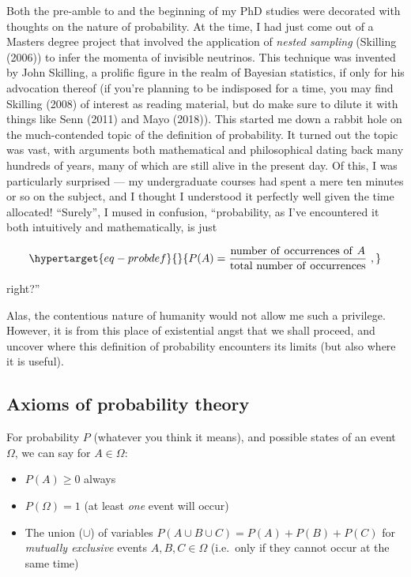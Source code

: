 \documentclass[
  11pt,
  numbers=noendperiod]{book}
\providecommand{\tightlist}{%
  \setlength{\itemsep}{0pt}\setlength{\parskip}{0pt}}\usepackage{longtable,booktabs,array}
\begin{document}
Both the pre-amble to and the beginning of my PhD studies were decorated
with thoughts on the nature of probability. At the time, I had just come
out of a Masters degree project that involved the application of
\emph{nested sampling} (Skilling (2006)) to infer the momenta of invisible
neutrinos. This technique was invented by John Skilling, a prolific
figure in the realm of Bayesian statistics, if only for his advocation
thereof (if you're planning to be indisposed for a time, you may find
Skilling (2008) of interest as reading material, but do make sure to
dilute it with things like Senn (2011) and Mayo (2018)). This started me
down a rabbit hole on the much-contended topic of the definition of
probability. It turned out the topic was vast, with arguments both
mathematical and philosophical dating back many hundreds of years, many
of which are still alive in the present day. Of this, I was particularly
surprised --- my undergraduate courses had spent a mere ten minutes or
so on the subject, and I thought I understood it perfectly well given
the time allocated! ``Surely'', I mused in confusion, ``probability, as
I've encountered it both intuitively and mathematically, is just

\begin{equation}\protect\hypertarget{eq-probdef}{}{
P(A) = \frac{\mathrm{number~of~occurrences~of~}A}{\mathrm{total~number~of~occurrences}}~,
}\label{eq-probdef}\end{equation}

right?''

Alas, the contentious nature of humanity would not allow me such a
privilege. However, it is from this place of existential angst that we
shall proceed, and uncover where this definition of probability
encounters its limits (but also where it is useful).

\hypertarget{axioms-of-probability-theory}{%
\subsection{Axioms of probability
theory}\label{axioms-of-probability-theory}}

For probability \(P\) (whatever you think it means), and possible states
of an event \(\Omega\), we can say for \(A \in \Omega\):

\begin{itemize}
\tightlist
\item
  \(P(A) \geqslant 0\) always
\item
  \(P(\Omega) = 1\) (at least \emph{one} event will occur)
\item
  The union (\(\cup\)) of variables
  \(P(A \cup B \cup C) = P(A) + P(B) + P(C)\) for \emph{mutually
  exclusive} events \(A,B,C \in \Omega\) (i.e.~only if they cannot occur
  at the same time)
\end{itemize}
\end{document}
